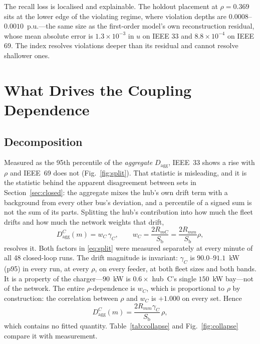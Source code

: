 \documentclass[lettersize,journal]{IEEEtran}
\newcommand{\Dagg}{D_{\mathrm{agg}}}
\newcommand{\Sb}{S_{\mathrm{b}}}
\begin{document}
The recall loss is localised and explainable. The holdout placement at
$\rho=0.369$ sits at the lower edge of the violating regime, where violation
depths are $0.0008$--$0.0010$~p.u.---the same size as the first-order model's
own reconstruction residual, whose mean absolute error is
$1.3\times10^{-3}$ in $u$ on IEEE 33 and $8.8\times10^{-4}$ on IEEE 69. The
index resolves violations deeper than its residual and cannot resolve shallower
ones.

\section{What Drives the Coupling Dependence}\label{sec:mech}

\subsection{Decomposition}
Measured as the 95th percentile of the \emph{aggregate} $\Dagg$, IEEE~33 shows
a rise with $\rho$ and IEEE~69 does not (Fig.~\ref{fig:split}). That statistic
is misleading, and it is the statistic behind the apparent disagreement between
sets in Section~\ref{sec:closed}: the aggregate mixes the hub's own drift term with a background
from every other bus's deviation, and a percentile of a signed sum is not the
sum of its parts. Splitting the hub's contribution into how much the fleet
drifts and how much the network weights that drift,
\begin{equation}\label{eq:split}
\Dagg^{C}(m)=w_C\,\gamma_C,\qquad w_C=\frac{2R_{mC}}{\Sb}=\frac{2R_{mm}}{\Sb}\rho,
\end{equation}
resolves it. Both factors in \eqref{eq:split} were measured separately at every minute of all 48
closed-loop runs. The drift magnitude is invariant: $\gamma_C$ is
$90.0$--$91.1$~kW (p95) in every run, at every $\rho$, on every feeder, at both
fleet sizes and both bands. It is a property of the charger---$90$~kW is
$0.6\times$ hub~C's single $150$~kW bay---not of the network. The entire
$\rho$-dependence is $w_C$, which is proportional to $\rho$ by construction:
the correlation between $\rho$ and $w_C$ is $+1.000$ on every set. Hence
\begin{equation}\label{eq:closedform}
\Dagg^{C}(m)=\frac{2R_{mm}\gamma_C}{\Sb}\,\rho,
\end{equation}
which contains no fitted quantity. Table~\ref{tab:collapse} and
Fig.~\ref{fig:collapse} compare it with measurement.
\end{document}
